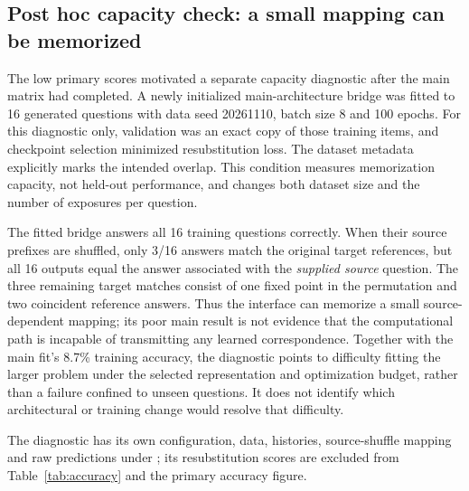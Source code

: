 \subsection{Post hoc capacity check: a small mapping can be memorized}

The low primary scores motivated a separate capacity diagnostic after the main
matrix had completed.
A newly initialized main-architecture bridge was fitted to 16 generated questions
with data seed 20261110, batch size 8 and 100 epochs.
For this diagnostic only, validation was an exact copy of those training items,
and checkpoint selection minimized resubstitution loss.
The dataset metadata explicitly marks the intended overlap.
This condition measures memorization capacity, not held-out performance, and
changes both dataset size and the number of exposures per question.

The fitted bridge answers all 16 training questions correctly.
When their source prefixes are shuffled, only 3/16 answers match the original
target references, but all 16 outputs equal the answer associated with the
\emph{supplied source} question.
The three remaining target matches consist of one fixed point in the permutation
and two coincident reference answers.
Thus the interface can memorize a small source-dependent mapping; its poor main
result is not evidence that the computational path is incapable of transmitting
any learned correspondence.
Together with the main fit's 8.7\% training accuracy, the diagnostic points to
difficulty fitting the larger problem under the selected representation and
optimization budget, rather than a failure confined to unseen questions.
It does not identify which architectural or training change would resolve that
difficulty.

The diagnostic has its own configuration, data, histories, source-shuffle mapping
and raw predictions under ; its resubstitution scores are
excluded from Table~\ref{tab:accuracy} and the primary accuracy figure.
